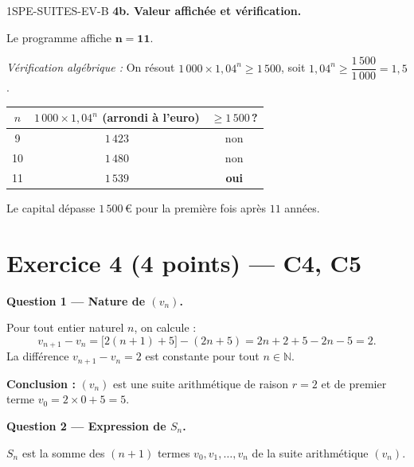 \begin{corrige}{1SPE-SUITES-EV-B}
\textbf{4b. Valeur affichée et vérification.}


Le programme affiche $\mathbf{n = 11}$.

\textit{Vérification algébrique :} On résout $1\,000 \times 1{,}04^n \geq 1\,500$, soit $1{,}04^n \geq \dfrac{1\,500}{1\,000} = 1{,}5$.

\begin{center}
\begin{tabular}{c|c|c}
$n$ & $1\,000 \times 1{,}04^n$ (arrondi à l'euro) & $\geq 1\,500$\,? \\
\hline
9  & $1\,423$ & non \\
10 & $1\,480$ & non \\
11 & $1\,539$ & \textbf{oui} \\
\end{tabular}
\end{center}

Le capital dépasse $1\,500$\,€ pour la première fois après $\boxed{11}$ années. \checkmark

\section*{Exercice 4 \hfill (4 points) — C4, C5}


\bigskip
\textbf{Question 1 — Nature de $(v_n)$.}


Pour tout entier naturel $n$, on calcule :
\[
  v_{n+1} - v_n = \bigl[2(n+1)+5\bigr] - (2n+5) = 2n + 2 + 5 - 2n - 5 = 2.
\]
La différence $v_{n+1} - v_n = 2$ est constante pour tout $n \in \mathbb{N}$.

\textbf{Conclusion :} $(v_n)$ est une suite arithmétique de raison $r = 2$ et de premier terme $v_0 = 2 \times 0 + 5 = 5$.

\medskip
\textbf{Question 2 — Expression de $S_n$.}


$S_n$ est la somme des $(n+1)$ termes $v_0, v_1, \ldots, v_n$ de la suite arithmétique $(v_n)$.


\end{corrige}
